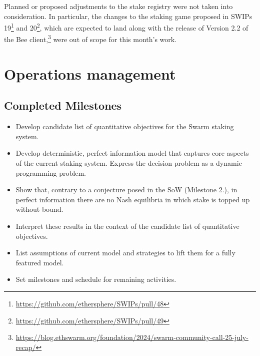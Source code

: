 Planned or proposed adjustments to the stake registry were not taken into consideration. In particular, the changes to the staking game proposed in SWIPs 19\footnote{\url{https://github.com/ethersphere/SWIPs/pull/48}} and 20\footnote{\url{https://github.com/ethersphere/SWIPs/pull/49}}, which are expected to land along with the release of Version 2.2 of the Bee client,\footnote{\url{https://blog.ethswarm.org/foundation/2024/swarm-community-call-25-july-recap/}} were out of scope for this month's work.

\section*{Operations management}

\subsection*{Completed Milestones}

\begin{itemize}
  \item Develop candidate list of quantitative objectives for the Swarm staking system.
  \item Develop deterministic, perfect information model that captures core aspects of the current staking system. Express the decision problem as a dynamic programming problem.
  \item Show that, contrary to a conjecture posed in the SoW (Milestone 2.), in perfect information there are no Nash equilibria in which stake is topped up without bound.
  \item Interpret these results in the context of the candidate list of quantitative objectives.
  \item List assumptions of current model and strategies to lift them for a fully featured model.
  \item Set milestones and schedule for remaining activities.
  \end{itemize}

